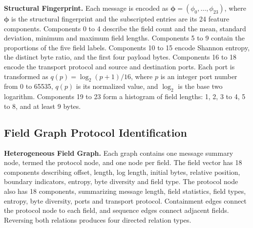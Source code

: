 \documentclass{article}
\begin{document}
\textbf{Structural Fingerprint.} Each message is encoded as
$\boldsymbol{\phi}=(\phi_0,\ldots,\phi_{23})$, where $\boldsymbol{\phi}$ is the
structural fingerprint and the subscripted entries are its 24 feature components.
Components 0 to 4 describe the field count and the mean, standard deviation, minimum
and maximum field lengths. Components 5 to 9 contain the proportions of the five
field labels. Components 10 to 15 encode Shannon entropy, the distinct byte
ratio, and the first four payload bytes. Components 16 to 18 encode
the transport protocol and source and destination ports. Each port is transformed
as $q(p)=\log_2(p+1)/16$, where $p$ is an integer port number from 0 to 65535,
$q(p)$ is its normalized value, and $\log_2$ is the base two logarithm. Components
19 to 23 form a histogram of field lengths: 1, 2, 3 to 4, 5 to 8, and at least 9 bytes.

\subsection{Field Graph Protocol Identification}
\label{ssec:proto}

\textbf{Heterogeneous Field Graph.} Each graph contains one message summary node,
termed the protocol node, and one node per field. The field vector has 18 components describing offset, length, log
length, initial bytes, relative position, boundary indicators, entropy, byte diversity
and field type. The protocol node also has 18 components, summarizing message length,
field statistics, field types, entropy, byte diversity, ports and transport protocol.
Containment edges connect the protocol node to each field, and sequence edges connect
adjacent fields. Reversing both relations produces four directed relation types.
\end{document}
